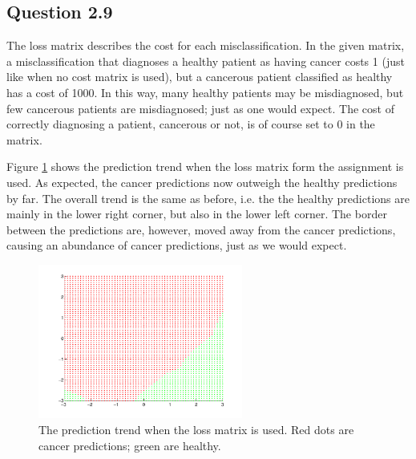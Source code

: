 \subsection*{Question 2.9}

The loss matrix describes the cost for each misclassification.
In the given matrix, a misclassification that diagnoses a healthy patient as having cancer costs 1 (just like when no cost matrix is used), but a cancerous patient classified as healthy has a cost of 1000.
In this way, many healthy patients may be misdiagnosed, but few cancerous patients are misdiagnosed; just as one would expect.
The cost of correctly diagnosing a patient, cancerous or not, is of course set to $0$ in the matrix.

Figure \ref{fig:q29} shows the prediction trend when the loss matrix form the assignment is used.
As expected, the cancer predictions now outweigh the healthy predictions by far.
The overall trend is the same as before, i.e. the the healthy predictions are mainly in the lower right corner, but also in the lower left corner.
The border between the predictions are, however, moved away from the cancer predictions, causing an abundance of cancer predictions, just as we would expect.

\begin{figure}[!htbp]
  \centering
  \includegraphics[width=0.6\textwidth]{./images/q209.pdf}
  \caption{The prediction trend when the loss matrix is used. Red dots are cancer predictions; green are healthy.}
  \label{fig:q29}
\end{figure}
